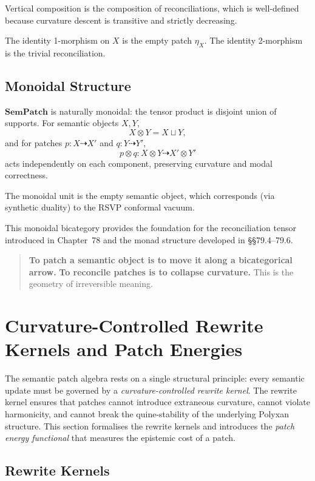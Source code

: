 Vertical composition is the composition of reconciliations,
which is well-defined because curvature descent is transitive and strictly decreasing.

The identity 1-morphism on $X$ is the empty patch $\eta_X$.
The identity 2-morphism is the trivial reconciliation.

\subsection{Monoidal Structure}
\label{subsec:79-1-monoidal}

$\mathbf{SemPatch}$ is naturally monoidal:
the tensor product is disjoint union of supports.
For semantic objects $X,Y$,
\[
X\otimes Y = X\sqcup Y,
\]
and for patches $p:X\dasharrow X'$ and $q:Y\dasharrow Y'$,
\[
p\otimes q : X\otimes Y \dasharrow X'\otimes Y'
\]
acts independently on each component, preserving curvature and modal correctness.

The monoidal unit is the empty semantic object,
which corresponds (via synthetic duality) to the RSVP conformal vacuum.

This monoidal bicategory provides the foundation for the reconciliation tensor
introduced in Chapter~78 and the monad structure developed in §§79.4–79.6.

\begin{quote}
\textbf{To patch a semantic object is to move it along a bicategorical arrow.}  
\textbf{To reconcile patches is to collapse curvature.}  
This is the geometry of irreversible meaning.
\end{quote}

\section{Curvature-Controlled Rewrite Kernels and Patch Energies}
\label{sec:79-2}

The semantic patch algebra rests on a single structural principle:
every semantic update must be governed by a \emph{curvature-controlled rewrite kernel}.
The rewrite kernel ensures that patches cannot introduce extraneous curvature,
cannot violate harmonicity, and cannot break the quine-stability of the underlying
Polyxan structure.  
This section formalises the rewrite kernels and introduces the
\emph{patch energy functional} that measures the epistemic cost of a patch.

\subsection{Rewrite Kernels}
\label{subsec:79-2-kernels}

